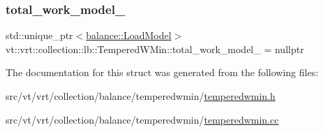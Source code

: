 \mbox{\label{structvt_1_1vrt_1_1collection_1_1lb_1_1_tempered_w_min_a62d4723702739009fbec9861b32b242d}} 
\subsubsection{\texorpdfstring{total\+\_\+work\+\_\+model\+\_\+}{total\_work\_model\_}}
{\footnotesize\ttfamily std\+::unique\+\_\+ptr$<$\hyperlink{structvt_1_1vrt_1_1collection_1_1balance_1_1_load_model}{balance\+::\+Load\+Model}$>$ vt\+::vrt\+::collection\+::lb\+::\+Tempered\+W\+Min\+::total\+\_\+work\+\_\+model\+\_\+ = nullptr\hspace{0.3cm}{\ttfamily [private]}}



The documentation for this struct was generated from the following files\+:\begin{DoxyCompactItemize}
\item 
src/vt/vrt/collection/balance/temperedwmin/\hyperlink{temperedwmin_8h}{temperedwmin.\+h}\item 
src/vt/vrt/collection/balance/temperedwmin/\hyperlink{temperedwmin_8cc}{temperedwmin.\+cc}\end{DoxyCompactItemize}
